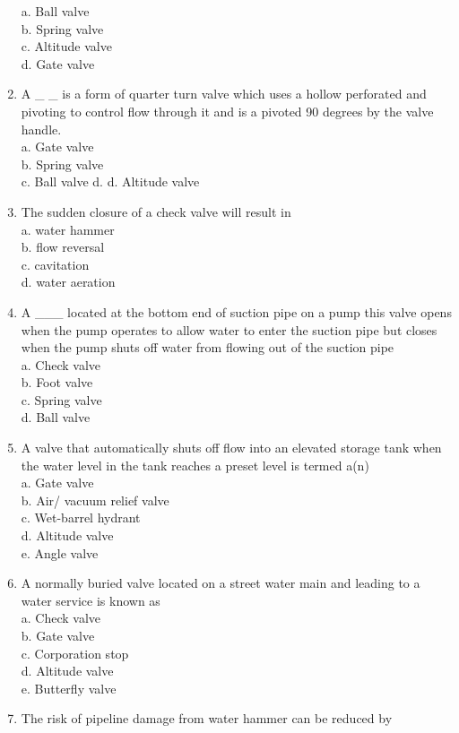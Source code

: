 \begin{enumerate}[1.]
a. Ball valve\\
b. Spring valve\\
c. Altitude valve\\
d. Gate valve\\
\item A \_ \_ is a form of quarter turn valve which uses a hollow perforated and pivoting to control flow through it and is a pivoted 90 degrees by the valve handle.\\
a. Gate valve\\
b. Spring valve\\
c. Ball valve d. d. Altitude valve\\
\item The sudden closure of a check valve will result in\\
a. water hammer\\
b. flow reversal\\
c. cavitation\\
d. water aeration\\
\item A \_\_\_ located at the bottom end of suction pipe on a pump this valve opens when the pump operates to allow water to enter the suction pipe but closes when the pump shuts off water from flowing out of the suction pipe\\
a. Check valve\\
b. Foot valve\\
c. Spring valve\\
d. Ball valve\\
\item A valve that automatically shuts off flow into an elevated storage tank when the water level in the tank reaches a preset level is termed a(n)\\
a. Gate valve\\
b. Air/ vacuum relief valve\\
c. Wet-barrel hydrant\\
d. Altitude valve\\
e. Angle valve\\
\item A normally buried valve located on a street water main and leading to a water service is known as\\
a. Check valve\\
b. Gate valve\\
c. Corporation stop\\
d. Altitude valve\\
e. Butterfly valve\\
\item The risk of pipeline damage from water hammer can be reduced by\\

\end{enumerate}

